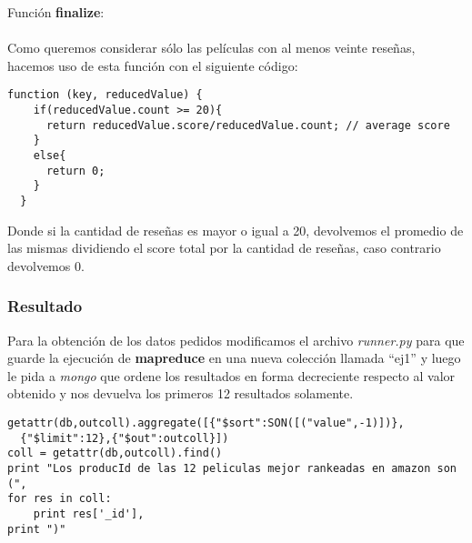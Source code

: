 Función \textbf{finalize}:\\\\
Como queremos considerar sólo las películas con al menos veinte reseñas, hacemos uso de esta función con el siguiente código:\\

\begin{lstlisting}[frame=leftline]
  function (key, reducedValue) { 
    if(reducedValue.count >= 20){
      return reducedValue.score/reducedValue.count;	// average score
    }
    else{
      return 0;
    }
  }
\end{lstlisting}

Donde si la cantidad de reseñas es mayor o igual a 20, devolvemos el promedio de las mismas dividiendo el score total por la cantidad de reseñas, caso contrario devolvemos 0.

\subsubsection{Resultado}

Para la obtención de los datos pedidos modificamos el archivo \textit{runner.py} para que guarde la ejecución de \textbf{mapreduce} en una nueva colección llamada ``ej1'' y luego le pida a \textit{mongo} que ordene los resultados en forma decreciente respecto al valor obtenido y nos devuelva los primeros 12 resultados solamente.\\

\begin{lstlisting}[frame=leftline]
getattr(db,outcoll).aggregate([{"$sort":SON([("value",-1)])},
  {"$limit":12},{"$out":outcoll}])
coll = getattr(db,outcoll).find()
print "Los producId de las 12 peliculas mejor rankeadas en amazon son (",
for res in coll:
	print res['_id'],
print ")"
\end{lstlisting}

